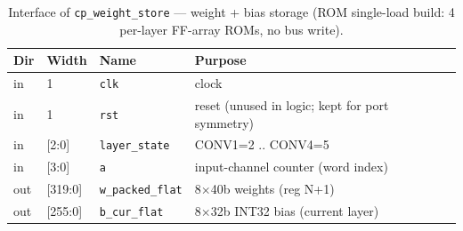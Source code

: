 \begin{table}[t]
\centering
\caption{Interface of \texttt{cp\_weight\_store} — weight + bias storage
(ROM single-load build: 4 per-layer FF-array ROMs, no bus write).}
\label{tab:if-cp-wstore}
\small
\setlength{\tabcolsep}{4pt}
\renewcommand{\arraystretch}{1.1}
\begin{tabular}{@{}llll@{}}
\toprule
\textbf{Dir} & \textbf{Width} & \textbf{Name} & \textbf{Purpose} \\
\midrule
in  & 1       & \texttt{clk}           & clock \\
in  & 1       & \texttt{rst}           & reset (unused in logic; kept for port symmetry) \\
in  & [2:0]   & \texttt{layer\_state}  & CONV1=2 .. CONV4=5 \\
in  & [3:0]   & \texttt{a}             & input-channel counter (word index) \\
out & [319:0] & \texttt{w\_packed\_flat}& 8$\times$40b weights (reg N+1) \\
out & [255:0] & \texttt{b\_cur\_flat}  & 8$\times$32b INT32 bias (current layer) \\
\bottomrule
\end{tabular}
\end{table}


